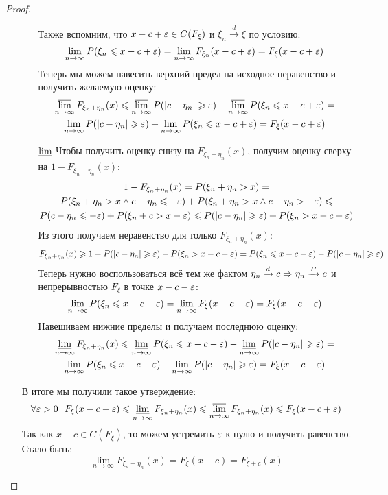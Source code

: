 \begin{proof}
\begin{enumerate}
\begin{itemize}
\[			\]
			Также вспомним, что $x - c + \varepsilon \in C(F_\xi)$ и $\xi_n \xrightarrow{d} \xi$ по условию:
			\[
				\lim_{n \to \infty} P(\xi_n \leqslant x - c + \varepsilon) = \lim_{n \to \infty} F_{\xi_n}(x - c + \varepsilon) = F_\xi(x - c + \varepsilon)
			\]
			Теперь мы можем навесить верхний предел на исходное неравенство и получить желаемую оценку:
			\begin{multline*}
				\varlimsup_{n \to \infty} F_{\xi_n + \eta_n}(x) \leqslant \varlimsup_{n \to \infty} P(|c - \eta_n| \geqslant \varepsilon) + \varlimsup_{n \to \infty} P(\xi_n \leqslant x - c + \varepsilon) =
				\\
				\lim_{n \to \infty} P(|c - \eta_n| \geqslant \varepsilon) + \lim_{n \to \infty} P(\xi_n \leqslant x - c + \varepsilon) = F_\xi(x - c + \varepsilon)
			\end{multline*}
			
			\item[$\varliminf$] Чтобы получить оценку снизу на $F_{\xi_n + \eta_n}(x)$, получим оценку сверху на $1 - F_{\xi_n + \eta_n}(x)$:
			\begin{multline*}
				1 - F_{\xi_n + \eta_n}(x) = P(\xi_n + \eta_n > x) =
				\\
				P(\xi_n + \eta_n > x \wedge c - \eta_n \leqslant -\varepsilon) + P(\xi_n + \eta_n > x \wedge c - \eta_n > -\varepsilon) \leqslant
				\\
				P(c - \eta_n \leqslant -\varepsilon) + P(\xi_n + c > x - \varepsilon) \leqslant P(|c - \eta_n| \geqslant \varepsilon) + P(\xi_n > x - c - \varepsilon)
			\end{multline*}
			Из этого получаем неравенство для только $F_{\xi_n + \eta_n}(x)$:
			\[
				F_{\xi_n + \eta_n}(x) \geqslant 1 - P(|c - \eta_n| \geqslant \varepsilon) - P(\xi_n > x - c - \varepsilon) = P(\xi_n \leqslant x - c - \varepsilon) - P(|c - \eta_n| \geqslant \varepsilon)
			\]
			Теперь нужно воспользоваться всё тем же фактом $\eta_n \xrightarrow{d} c \Rightarrow \eta_n \xrightarrow{P} c$ и непрерывностью $F_\xi$ в точке $x - c - \varepsilon$:
			\[
				\lim_{n \to \infty} P(\xi_n \leqslant x - c - \varepsilon) = \lim_{n \to \infty} F_\xi(x - c - \varepsilon) = F_\xi(x - c - \varepsilon)
			\]
			Навешиваем нижние пределы и получаем последнюю оценку:
			\begin{multline*}
				\varliminf_{n \to \infty} F_{\xi_n + \eta_n}(x) \leqslant \varliminf_{n \to \infty} P(\xi_n \leqslant x - c - \varepsilon) - \varliminf_{n \to \infty} P(|c - \eta_n| \geqslant \varepsilon) =
				\\
				\lim_{n \to \infty} P(\xi_n \leqslant x - c - \varepsilon) - \lim_{n \to \infty} P(|c - \eta_n| \geqslant \varepsilon) = F_\xi(x - c - \varepsilon)
			\end{multline*}
		\end{itemize}
		В итоге мы получили такое утверждение:
		\[
			\forall \varepsilon > 0\ \ F_\xi(x - c - \varepsilon) \leqslant \varliminf_{n \to \infty} F_{\xi_n + \eta_n}(x) \leqslant \varlimsup_{n \to \infty} F_{\xi_n + \eta_n}(x) \leqslant F_\xi(x - c + \varepsilon)
		\]
		Так как $x - c \in C(F_\xi)$, то можем устремить $\varepsilon$ к нулю и получить равенство. Стало быть:
		\[
			\lim_{n \to \infty} F_{\xi_n + \eta_n}(x) = F_\xi(x - c) = F_{\xi + c}(x)
		\]


\end{enumerate}
\end{proof}
